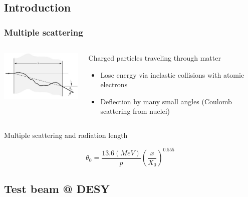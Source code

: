 \documentclass{beamer}
\begin{document}
    \subsection{Introduction}

    \begin{frame}
      \frametitle{Multiple scattering}
      
      \begin{columns}[c]
        \begin{column}{6cm}
          \centering
          \includegraphics[width = 5cm]{Pictures/multiple_scattering.jpg}
        \end{column}
        \begin{column}{6cm}
          \begin{block}{Charged particles traveling through matter}
            \begin{itemize}
              \item Lose energy via inelastic collisions with atomic electrons
              \item Deflection by many small angles (Coulomb scattering from nuclei)
            \end{itemize}
          \end{block}
        \end{column}
      \end{columns}

      \begin{block}{Multiple scattering and radiation length}
        \begin{center}
          \[ \theta_0 = \frac{13.6 (MeV)}{p}\left( \frac{x}{X_0}\right)^{0.555}\]
        \end{center}
      \end{block}
    \end{frame} 
    
    \subsection{Test beam @ DESY}
\end{document}

